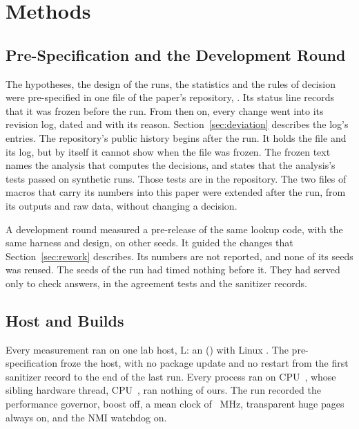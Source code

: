 \section{Methods}\label{sec:methods}

\subsection{Pre-Specification and the Development Round}\label{sec:prespec}

The hypotheses, the design of the runs, the statistics and the rules of decision were pre-specified
in one file of the paper's repository, \PreSpecFile. Its status line records that it was frozen
before the run. From then on, every change went into its revision log, dated and with its reason.
Section~\ref{sec:deviation} describes the log's entries. The repository's public history begins
after the run. It holds the file and its log, but by itself it cannot show when the file was frozen.
The frozen text names the analysis that computes the decisions, and states that the analysis's
tests passed on synthetic runs. Those tests are in the repository. The two files of macros that carry
its numbers into this paper were extended after the run, from its outputs and raw data, without
changing a decision.

A development round measured a pre-release of the same lookup code, with the same harness and
design, on other seeds. It guided the changes that Section~\ref{sec:rework} describes. Its numbers
are not reported, and none of its seeds was reused. The seeds of the run had timed nothing before
it. They had served only to check answers, in the agreement tests and the sanitizer records.

\subsection{Host and Builds}\label{sec:host}

Every measurement ran on one lab host, L: an \HostLCpu{} (\HostLArch) with Linux \KernelVersion. The
pre-specification froze the host, with no package update and no restart from the first sanitizer
record to the end of the last run. Every process ran on CPU~\TimedCpu, whose sibling hardware thread, CPU~\TimedCpuSibling,
ran nothing of ours. The run recorded the performance governor, boost off, a mean clock of
\MeanMhz~MHz, transparent huge pages always on, and the NMI watchdog on.


